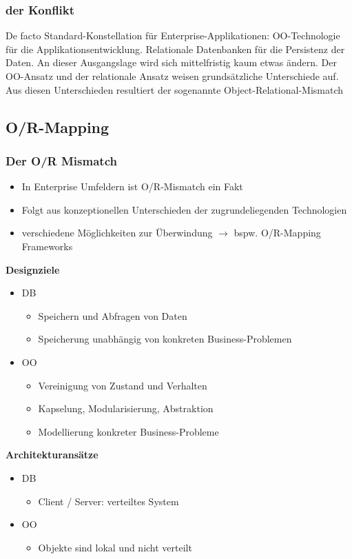\documentclass{report}
\theoremstyle{definition}
\theoremstyle{example}
\begin{document}
\subsubsection{der Konflikt}
De facto Standard-Konstellation für Enterprise-Applikationen: OO-Technologie für die Applikationsentwicklung. Relationale Datenbanken für die Persistenz der Daten. An dieser Ausgangslage wird sich mittelfristig kaum etwas ändern. Der OO-Ansatz und der relationale Ansatz weisen grundsätzliche Unterschiede auf. Aus diesen Unterschieden resultiert der sogenannte Object-Relational-Mismatch

\subsection{O/R-Mapping}
\subsubsection{Der O/R Mismatch}
\begin{itemize}
	\item In Enterprise Umfeldern ist O/R-Mismatch ein Fakt
	\item Folgt aus konzeptionellen Unterschieden der zugrundeliegenden Technologien
	\item verschiedene Möglichkeiten zur Überwindung $\rightarrow$ bspw. O/R-Mapping Frameworks
\end{itemize}

\textbf{Designziele}
\begin{itemize}
	\item {DB
		\begin{itemize}
			\item Speichern und Abfragen von Daten
			\item Speicherung unabhängig von konkreten Business-Problemen
		\end{itemize}
	}
	\item {OO
		\begin{itemize}
			\item Vereinigung von Zustand und Verhalten
			\item Kapselung, Modularisierung, Abstraktion
			\item Modellierung konkreter Business-Probleme
		\end{itemize}

	}
\end{itemize}

\textbf{Architekturansätze}
\begin{itemize}
	\item {DB
		\begin{itemize}
			\item Client / Server: verteiltes System
		\end{itemize}
	}
	\item {OO
		\begin{itemize}
			\item Objekte sind lokal und nicht verteilt
		\end{itemize}
	}
\end{itemize}
\end{document}
